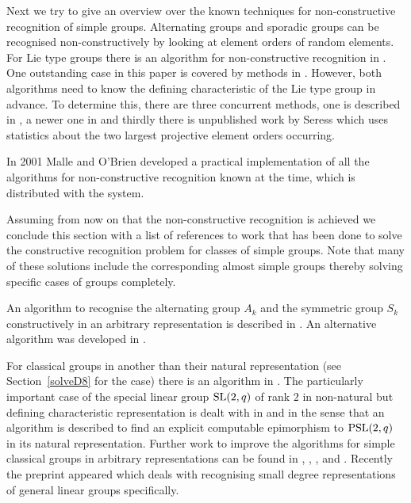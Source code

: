 Next we try to give an overview over the known techniques for
non-constructive recognition of simple groups. Alternating groups and
sporadic groups can be recognised non-constructively by looking at
element orders of random elements. For Lie type groups there is an
algorithm for non-constructive recognition in \cite{blackboxlienonconstr}.
One outstanding case in this paper is covered by methods in
\cite{altseimer}. However, both algorithms need to know the defining
characteristic of the Lie type group in advance. To determine this,
there are three concurrent methods, one is described in
\cite{primpowgraphs}, a newer one in \cite{findingcharlie} and thirdly there
is unpublished work by Seress which uses statistics about the two largest 
projective element orders occurring.

In 2001 Malle and O'Brien developed a practical implementation of all 
the algorithms for non-constructive recognition known at the time,
which is distributed with the {\MAGMA} system.

Assuming from now on that the non-constructive recognition is achieved we
conclude this section with a list of references to work that has been done
to solve the constructive recognition problem for classes of simple groups.
Note that many of these solutions include the corresponding almost simple
groups thereby solving specific cases of  groups completely.

An algorithm to recognise the alternating group $A_k$ and the symmetric
group $S_k$ constructively in an arbitrary 
representation is described in \cite{bbsymaltconstr}. An alternative
algorithm was developed in \cite{bratuspak}.

For classical groups in another than their natural representation (see
Section~\ref{solveD8} for the  case) there is an algorithm in
\cite{bbclassical}. The particularly important case of the special linear
group $\SL(2,q)$ of rank $2$ in non-natural but defining characteristic
representation is dealt with in \cite{classicallargefield}
and \cite{psl2qconstr} in the sense that an algorithm is described to find
an explicit computable epimorphism to $\PSL(2,q)$ in its natural
representation. Further work to improve the algorithms for simple classical 
groups in arbitrary representations can be found in \cite{bbomega},
\cite{bbunitary}, \cite{bbpsldq}, \cite{computingmatrix} and
\cite{bbortho}. Recently the preprint \cite{smalldegreegl} appeared which
deals with recognising small degree representations of general linear
groups specifically.

